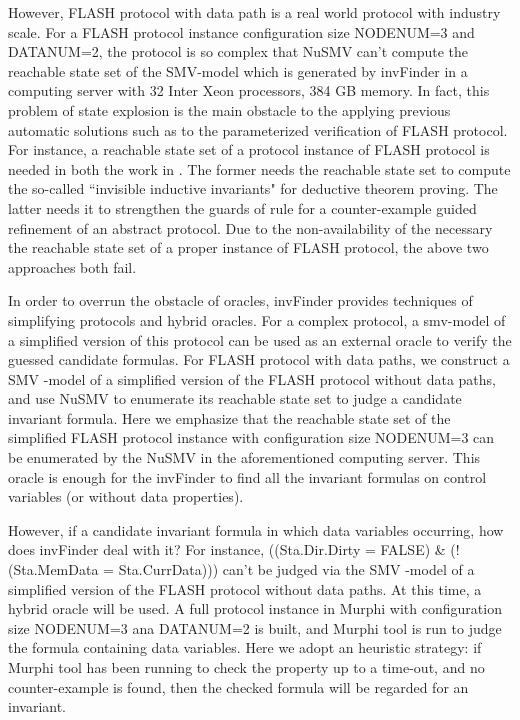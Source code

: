 \documentclass{llncs}
\newcommand{\bedt}[1]{{\color{blue}#1}}
\begin{document}
However, FLASH protocol with data path is a real world protocol with industry scale. For a FLASH protocol   instance configuration size NODENUM=3 and DATANUM=2, the protocol is so complex that NuSMV can't compute the reachable state set of the SMV-model which is generated by {\sf invFinder} in a computing server  with 32 Inter Xeon processors, 384 GB memory. In fact, this problem of  state explosion is the main obstacle to the applying previous automatic solutions such as \cite{Arons2001,Lv2007} to the parameterized verification of FLASH protocol. For instance, a reachable state set of a protocol instance of FLASH protocol is needed in both the work in \cite{Arons2001,Lv2007}. The former needs the reachable state set to compute the so-called ``invisible inductive invariants" for deductive theorem proving. The latter needs it to strengthen
 the guards of rule for a counter-example guided refinement of an abstract protocol. Due to the non-availability of the necessary the reachable state set of a proper instance of FLASH protocol, the above two approaches both fail.

 In order to overrun the obstacle of oracles, {\sf invFinder} provides techniques of simplifying protocols and hybrid oracles. For a complex protocol, a smv-model of a  simplified version of this protocol can be used as an external oracle to verify the guessed candidate formulas. For FLASH protocol with data paths,  we construct a SMV -model of a simplified version of the FLASH protocol without data paths, and use NuSMV to enumerate its reachable state set to judge a candidate invariant formula. Here we  emphasize that the reachable state set of the simplified FLASH protocol  instance  with configuration size NODENUM=3 can be enumerated by the NuSMV in the aforementioned computing server. This oracle is enough for the {\sf invFinder} to find all the invariant formulas on control variables (or without data properties).

 However, if a candidate invariant formula in which data variables occurring, how does {\sf invFinder} deal with it?  For instance, ((Sta.Dir.Dirty = FALSE) \& (!(Sta.MemData = Sta.CurrData))) can't be judged via the SMV -model of a simplified version of the FLASH protocol without data paths. At this time, a hybrid oracle will be used.  A full protocol instance in Murphi  with configuration size NODENUM=3 ana DATANUM=2 \bedt{is built}, and  Murphi \bedt{tool} is run to judge the formula containing data variables. Here we adopt an \bedt{heuristic} strategy: \bedt{if Murphi tool has been running to check the property up to a time-out,} and no counter-example is found, then the checked formula will be regarded for an invariant.
\end{document}
